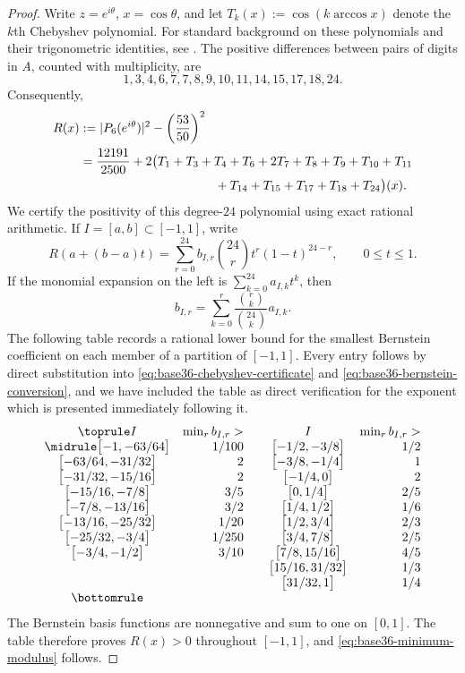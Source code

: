 \documentclass[12pt]{amsart}
\numberwithin{equation}{section}
\begin{document}
\begin{proof}
Write $z=e^{i\theta}$, $x=\cos\theta$, and let
$T_k(x):=\cos(k\arccos x)$ denote the $k$th Chebyshev polynomial.  For standard background on these polynomials and their trigonometric identities, see \cite{Rivlin}.  The
positive differences between pairs of digits in $A$, counted with
multiplicity, are
\[
 1,3,4,6,7,7,8,9,10,11,14,15,17,18,24.
\]
Consequently,
\begin{equation}\label{eq:base36-chebyshev-certificate}
\begin{aligned}
 R(x)
 &:=
 |P_6(e^{i\theta})|^2-\left(\frac{53}{50}\right)^2\\
 &=\frac{12191}{2500}
 +2\bigl(T_1+T_3+T_4+T_6+2T_7+T_8+T_9+T_{10}+T_{11}\\
 &\hspace{38mm}{}+T_{14}+T_{15}+T_{17}+T_{18}+T_{24}\bigr)(x).
\end{aligned}
\end{equation}
We certify the positivity of this degree-$24$ polynomial using exact rational
arithmetic.  If $I=[a,b]\subset[-1,1]$, write
\[
 R(a+(b-a)t)
 =\sum_{r=0}^{24}b_{I,r}\binom{24}{r}t^r(1-t)^{24-r},
 \qquad 0\leq t\leq1.
\]
If the monomial expansion on the left is
$\sum_{k=0}^{24}a_{I,k}t^k$, then
\begin{equation}\label{eq:base36-bernstein-conversion}
 b_{I,r}
 =\sum_{k=0}^r
 \frac{\binom rk}{\binom{24}{k}}a_{I,k}.
\end{equation}
The following table records a rational lower bound for the smallest
Bernstein coefficient on each member of a partition of $[-1,1]$.  Every
entry follows by direct substitution into
\eqref{eq:base36-chebyshev-certificate} and
\eqref{eq:base36-bernstein-conversion}, and we have included the table as direct verification for the exponent which is presented immediately following it.
\[
\begin{array}{@{}cr@{\qquad}cr@{}}
\toprule
 I&\min_r b_{I,r}>&I&\min_r b_{I,r}>\\
\midrule
\bigl[-1,-63/64\bigr]&1/100&\bigl[-1/2,-3/8\bigr]&1/2\\
\bigl[-63/64,-31/32\bigr]&2&\bigl[-3/8,-1/4\bigr]&1\\
\bigl[-31/32,-15/16\bigr]&2&\bigl[-1/4,0\bigr]&2\\
\bigl[-15/16,-7/8\bigr]&3/5&\bigl[0,1/4\bigr]&2/5\\
\bigl[-7/8,-13/16\bigr]&3/2&\bigl[1/4,1/2\bigr]&1/6\\
\bigl[-13/16,-25/32\bigr]&1/20&\bigl[1/2,3/4\bigr]&2/3\\
\bigl[-25/32,-3/4\bigr]&1/250&\bigl[3/4,7/8\bigr]&2/5\\
\bigl[-3/4,-1/2\bigr]&3/10&\bigl[7/8,15/16\bigr]&4/5\\
&&\bigl[15/16,31/32\bigr]&1/3\\
&&\bigl[31/32,1\bigr]&1/4
\\
\bottomrule
\end{array}
\]
The Bernstein basis functions are nonnegative and sum to one on $[0,1]$.
The table therefore proves $R(x)>0$ throughout $[-1,1]$, and
\eqref{eq:base36-minimum-modulus} follows.
\end{proof}
\end{document}
